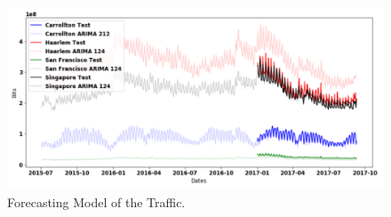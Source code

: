 \begin{figure}[!h]
  \centering
  \includegraphics[scale=0.16]{building_energy_model/img/_arima.png}
  \caption[ARIMA for BEM]{Forecasting Model of the Traffic.}
  \label{fig:arima_bem}
  \end{figure}